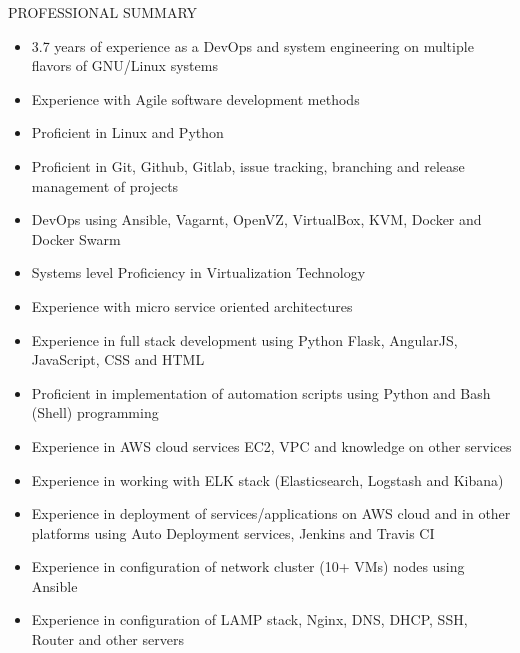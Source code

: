 \documentclass{resume} %
\begin{document}
\begin{rSection}{PROFESSIONAL SUMMARY}
  
  \begin{itemize}
    
  \item 3.7 years of experience as a DevOps and system engineering on
    multiple flavors of GNU/Linux systems

  \item Experience with Agile software development methods

  \item Proficient in Linux and Python

  \item Proficient in Git, Github, Gitlab, issue tracking,
    branching and release management of projects

  \item DevOps using Ansible, Vagarnt, OpenVZ, VirtualBox,
    KVM, Docker and Docker Swarm

  \item Systems level Proficiency in Virtualization
        Technology
  
  \item Experience with micro service oriented architectures

  \item Experience in full stack development using Python
    Flask, AngularJS, JavaScript, CSS and HTML

  \item Proficient in implementation of automation scripts
    using Python and Bash (Shell) programming

  \item Experience in AWS cloud services EC2, VPC and knowledge on
    other services

  \item Experience in working with ELK stack (Elasticsearch,
    Logstash and Kibana)
    
  \item Experience in deployment of services/applications on AWS cloud
    and in other platforms using Auto Deployment services, Jenkins and
    Travis CI

  \item Experience in configuration of network cluster (10+ VMs)
    nodes using Ansible
    
  \item Experience in configuration of LAMP stack,
    Nginx, DNS, DHCP, SSH, Router and other servers


\end{itemize}
\end{rSection}
\end{document}
